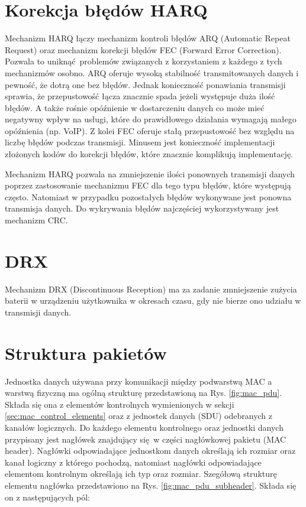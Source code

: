 \section{Korekcja błędów HARQ}

Mechanizm HARQ łączy mechanizm kontroli błędów ARQ (Automatic Repeat Request) oraz mechanizm korekcji błędów FEC (Forward Error Correction). Pozwala to uniknąć problemów związanych z korzystaniem z każdego z tych mechanizmów osobno. 
ARQ oferuje wysoką stabilność transmitowanych danych i pewność, że dotrą one bez błędów. Jednak konieczność ponawiania transmisji sprawia, że przepustowość łącza znacznie spada jeżeli występuje duża ilość błędów. A także rośnie opóźnienie w dostarczeniu danych co może mieć negatywny wpływ na usługi, które do prawidłowego działania wymagają małego opóźnienia (np. VoIP).
Z kolei FEC oferuje stałą przepustowość bez względu na liczbę błędów podczas transmisji. Minusem jest konieczność implementacji złożonych kodów do korekcji błędów, które znacznie komplikują implementację.

Mechanizm HARQ pozwala na zmniejszenie ilości ponownych transmisji danych poprzez zastosowanie mechanizmu FEC dla tego typu błędów, które występują często. Natomiast w przypadku pozostałych błędów wykonywane jest ponowna transmisja danych. Do wykrywania błędów najczęściej wykorzystywany jest mechanizm CRC.

\section{DRX}

Mechanizm DRX (Discontinuous Reception) ma za zadanie zmniejszenie zużycia baterii w urządzeniu użytkownika w okresach czasu, gdy nie bierze ono udziału w transmisji danych.

\section{Struktura pakietów}

Jednostka danych używana przy komunikacji między podwarstwą MAC a warstwą fizyczną ma ogólną strukturę przedstawioną na Rys. \ref{fig:mac_pdu}. Składa się ona z elementów kontrolnych wymienionych w sekcji \ref{sec:mac_control_elements} oraz z jednostek danych (SDU) odebranych z kanałów logicznych. Do każdego elementu kontrolnego oraz jednostki danych przypisany jest nagłówek znajdujący się w części nagłówkowej pakietu (MAC header). Nagłówki odpowiadające jednostkom danych określają ich rozmiar oraz kanał logiczny z którego pochodzą, natomiast nagłówki odpowiadające elementom kontrolnym określają ich typ oraz rozmiar. Szegółową strukturę elementu nagłówka przedstawiono na Rys. \ref{fig:mac_pdu_subheader}. Składa się on z następujących pól:

